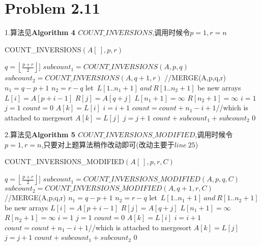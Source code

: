 \documentclass[twocolumn]{ctexart}
\begin{document}
\section*{Problem 2.11}
1.算法见\textbf{Algorithm 4 $COUNT\_INVERSIONS$},调用时候令$p=1,r=n$\\
	\begin{algorithm}[htbp]
	\caption {COUNT\_INVERSIONS$(A[\ ],p,r)$}
	\begin{algorithmic}[1]
			\STATE $q=\left\lfloor\frac{p+r}{2}\right\rfloor]$
			\STATE $subcount_1=COUNT\_INVERSIONS(A,p,q)$
			\STATE $subcount_2=COUNT\_INVERSIONS(A,q+1,r)$
			\STATE //MERGE(A,p,q,r)
			\STATE $n_1=q-p+1$
			\STATE $n_2=r-q$
			\STATE let\ $L[1..n_1+1]\ and\ R[1..n_2+1]$ be new arrays
				\STATE $L[i]=A[p+i-1]$
			\ENDFOR
				\STATE $R[j]=A[q+j]$
			\ENDFOR
			\STATE $L[n_1+1]=\infty$
			\STATE $R[n_2+1]=\infty$
			\STATE $i=1$
			\STATE $j=1$
			\STATE $count=0$
					\STATE $A[k]=L[i]$
					\STATE $i=i+1$
				\ELSE
					\STATE $count=count+n_1-i+1$//which is attached to mergesort 
					\STATE $A[k]=L[j]$
					\STATE $j=j+1$
				\ENDIF
			\ENDFOR
			\RETURN $count+subcount_1+subcount_2$
		\ELSE
			\RETURN $0$
		\ENDIF	
			
	\end{algorithmic}
\end{algorithm}
2.算法见\textbf{Algorithm 5 $COUNT\_INVERSIONS\_MODIFIED$},调用时候令$p=1,r=n$,只要对上题算法稍作改动即可(改动主要于$line\ 25$)\\
\begin{algorithm}[htbp]
	\caption {COUNT\_INVERSIONS\_MODIFIED$(A[\ ],p,r,C)$}
	\begin{algorithmic}[1]
		\STATE $q=\left\lfloor\frac{p+r}{2}\right\rfloor]$
		\STATE $subcount_1=COUNT\_INVERSIONS\_MODIFIED(A,p,q,C)$
		\STATE $subcount_2=COUNT\_INVERSIONS\_MODIFIED(A,q+1,r,C)$
		\STATE //MERGE(A,p,q,r)
		\STATE $n_1=q-p+1$
		\STATE $n_2=r-q$
		\STATE let\ $L[1..n_1+1]\ and\ R[1..n_2+1]$ be new arrays
		\STATE $L[i]=A[p+i-1]$
		\ENDFOR
		\STATE $R[j]=A[q+j]$
		\ENDFOR
		\STATE $L[n_1+1]=\infty$
		\STATE $R[n_2+1]=\infty$
		\STATE $i=1$
		\STATE $j=1$
		\STATE $count=0$
		\STATE $A[k]=L[i]$
		\STATE $i=i+1$
		\ELSE
				\STATE $count=count+n_1-i+1$//which is attached to mergesort 
			\ENDIF
		\STATE $A[k]=L[j]$
		\STATE $j=j+1$
		\ENDIF
		\ENDFOR
		\RETURN $count+subcount_1+subcount_2$
		\ELSE
		\RETURN $0$
		\ENDIF	
		
	\end{algorithmic}
\end{algorithm}
\end{document}
